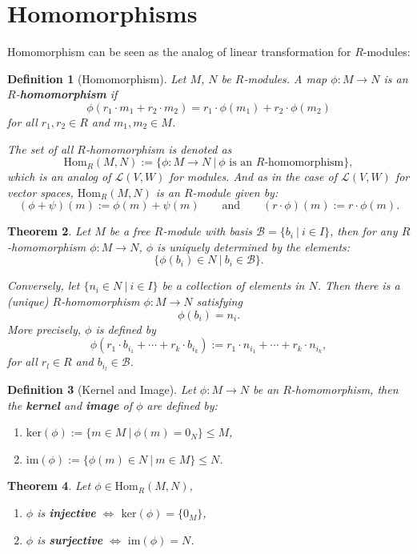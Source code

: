 \documentclass[12pt]{amsbook}
\newtheorem{theorem}{Theorem}[section]
\newtheorem{definition}[theorem]{Definition}
\begin{document}
\section{Homomorphisms} 
Homomorphism can be seen as the analog of linear transformation for $R$-modules:

\begin{definition} [Homomorphism]
    Let $M$, $N$ be $R$-modules. A map $\phi:M\to N$ is an $R$-{\bf homomorphism} if
    $$\phi(r_1\cdot m_1+r_2\cdot m_2)=r_1\cdot\phi(m_1)+r_2\cdot\phi(m_2)$$
    for all $r_1,r_2\in R$ and $m_1,m_2\in M$.

    The set of all $R$-homomorphism is denoted as 
    $$\mathrm{Hom}_{R}(M,N):=\{\phi:M\to N\ |\ \phi\text{ is an }R\text{-homomorphism}\},$$
    which is an analog of $\mathcal{L}(V,W)$ for modules. And as in the case of $\mathcal{L}(V,W)$ for vector spaces, $\mathrm{Hom}_{R}(M,N)$ is an $R$-module given by:
    $$(\phi+\psi)(m):=\phi(m)+\psi(m)\quad\quad\text{and}\quad\quad(r\cdot\phi)(m):=r\cdot\phi(m).$$
\end{definition}

\begin{theorem}
    Let $M$ be a free $R$-module with basis $\mathcal{B}=\{b_i\ |\ i\in I\}$, then for any $R$-homomorphism $\phi:M\to N$, $\phi$ is uniquely determined by the elements:
    $$\{\phi(b_i)\in N\ |\ b_i\in \mathcal{B}\}.$$

    Conversely, let $\{n_i\in N\ |\ i\in I\}$ be a collection of elements in $N$. Then there is a (unique) $R$-homomorphism $\phi:M\to N$ satisfying
    $$\phi(b_i)=n_i.$$
    More precisely, $\phi$ is defined by
    $$\phi(r_1\cdot b_{i_1}+\cdots+r_k\cdot b_{i_k}):=r_1\cdot n_{i_1}+\cdots+r_k\cdot n_{i_k},$$
    for all $r_l\in R$ and $b_{i_l}\in\mathcal{B}$.
\end{theorem}

\begin{definition} [Kernel and Image]
    Let $\phi:M\to N$ be an $R$-homomorphism, then the {\bf kernel} and {\bf image} of $\phi$ are defined by:
    \begin{enumerate}
        \item $\mathrm{ker}(\phi):=\{m\in M\ |\ \phi(m)=0_N\}\leq M$,
        \item $\mathrm{im}(\phi):=\{\phi(m)\in N\ |\ m\in M\}\leq N$.
    \end{enumerate}
\end{definition}

\begin{theorem}
    Let $\phi\in\mathrm{Hom}_{R}(M,N)$,
    \begin{enumerate}
        \item $\phi$ is {\bf injective}  $\Leftrightarrow$  $\mathrm{ker}(\phi)=\{0_M\}$,
        \item $\phi$ is {\bf surjective}  $\Leftrightarrow$  $\mathrm{im}(\phi)=N$.
    \end{enumerate}
\end{theorem}
\end{document}
